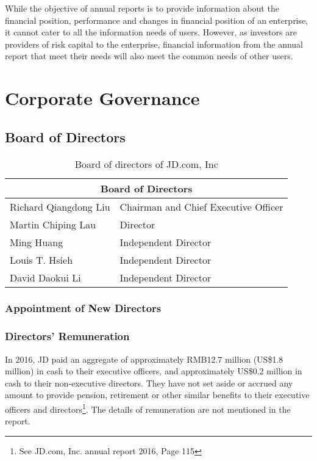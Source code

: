 While the objective of annual reports is to provide information about the financial position, performance and changes in financial position of an enterprise, it cannot cater to all the information needs of users. However, as investors are providers of risk capital to the enterprise, financial information from the annual report that meet their needs will also meet the common needs of other users.

\section{Corporate Governance}
\subsection{Board of Directors}

\begin{table}[H]	
\begin{center}
\begin{tabular}{ l|l }
	\hline
	\multicolumn{2}{c}{\textbf{Board of Directors}} \\
	\hline
	Richard Qiangdong Liu	&		Chairman and Chief Executive Officer \\
	\rowcolor[gray]{.95}
	Martin Chiping Lau		& 		Director\\
	Ming Huang				&		Independent Director \\
	\rowcolor[gray]{.95}
	Louis T. Hsieh			&		Independent Director \\
	David Daokui Li			&		Independent Director \\
	\hline
\end{tabular}
\end{center}
\caption{Board of directors of JD.com, Inc}\label{table:1}
\end{table}


	
 
\subsubsection{Appointment of New Directors}
\subsubsection{Directors’ Remuneration}
In 2016, JD paid an aggregate of approximately RMB12.7 million (US\$1.8 million) in cash to their executive officers, and approximately US\$0.2 million in cash to their non-executive directors. They have not set aside or accrued any amount to provide pension, retirement or other similar benefits to their executive officers and directors\footnote{See JD.com, Inc. annual report 2016, Page 115}.
The details of remuneration are not mentioned in the report.

